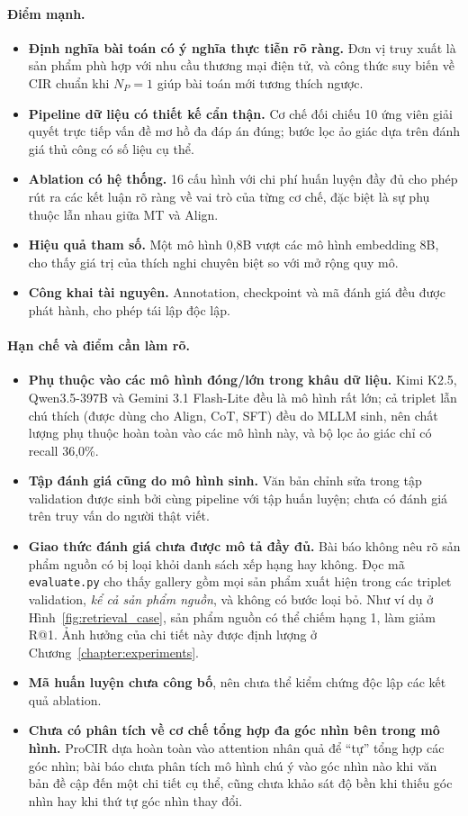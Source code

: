 \paragraph{Điểm mạnh.}
\begin{itemize}
    \item \textbf{Định nghĩa bài toán có ý nghĩa thực tiễn rõ ràng.} Đơn vị truy xuất là sản phẩm phù hợp với nhu cầu thương mại điện tử, và công thức suy biến về CIR chuẩn khi $N_P = 1$ giúp bài toán mới tương thích ngược.
    \item \textbf{Pipeline dữ liệu có thiết kế cẩn thận.} Cơ chế đối chiếu 10 ứng viên giải quyết trực tiếp vấn đề mơ hồ đa đáp án đúng; bước lọc ảo giác dựa trên đánh giá thủ công có số liệu cụ thể.
    \item \textbf{Ablation có hệ thống.} 16 cấu hình với chi phí huấn luyện đầy đủ cho phép rút ra các kết luận rõ ràng về vai trò của từng cơ chế, đặc biệt là sự phụ thuộc lẫn nhau giữa MT và Align.
    \item \textbf{Hiệu quả tham số.} Một mô hình 0,8B vượt các mô hình embedding 8B, cho thấy giá trị của thích nghi chuyên biệt so với mở rộng quy mô.
    \item \textbf{Công khai tài nguyên.} Annotation, checkpoint và mã đánh giá đều được phát hành, cho phép tái lập độc lập.
\end{itemize}

\paragraph{Hạn chế và điểm cần làm rõ.}
\begin{itemize}
    \item \textbf{Phụ thuộc vào các mô hình đóng/lớn trong khâu dữ liệu.} Kimi K2.5, Qwen3.5-397B và Gemini 3.1 Flash-Lite đều là mô hình rất lớn; cả triplet lẫn chú thích (được dùng cho Align, CoT, SFT) đều do MLLM sinh, nên chất lượng phụ thuộc hoàn toàn vào các mô hình này, và bộ lọc ảo giác chỉ có recall 36,0\%.
    \item \textbf{Tập đánh giá cũng do mô hình sinh.} Văn bản chỉnh sửa trong tập validation được sinh bởi cùng pipeline với tập huấn luyện; chưa có đánh giá trên truy vấn do người thật viết.
    \item \textbf{Giao thức đánh giá chưa được mô tả đầy đủ.} Bài báo không nêu rõ sản phẩm nguồn có bị loại khỏi danh sách xếp hạng hay không. Đọc mã \texttt{evaluate.py} cho thấy gallery gồm mọi sản phẩm xuất hiện trong các triplet validation, \emph{kể cả sản phẩm nguồn}, và không có bước loại bỏ. Như ví dụ ở Hình~\ref{fig:retrieval_case}, sản phẩm nguồn có thể chiếm hạng 1, làm giảm R@1. Ảnh hưởng của chi tiết này được định lượng ở Chương~\ref{chapter:experiments}.
    \item \textbf{Mã huấn luyện chưa công bố}, nên chưa thể kiểm chứng độc lập các kết quả ablation.
    \item \textbf{Chưa có phân tích về cơ chế tổng hợp đa góc nhìn bên trong mô hình.} ProCIR dựa hoàn toàn vào attention nhân quả để ``tự'' tổng hợp các góc nhìn; bài báo chưa phân tích mô hình chú ý vào góc nhìn nào khi văn bản đề cập đến một chi tiết cụ thể, cũng chưa khảo sát độ bền khi thiếu góc nhìn hay khi thứ tự góc nhìn thay đổi.
\end{itemize}
